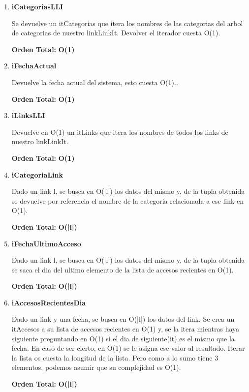 \begin{enumerate}
\item\textbf{iCategoriasLLI}
\par Se devuelve un itCategorias que itera los nombres de las categorias del arbol de categorias de nuestro linkLinkIt. Devolver el iterador cuesta O(1).
\par\textbf{Orden Total:} \textbf{O(1)}

\item\textbf{iFechaActual}
\par Devuelve la fecha actual del sistema, esto cuesta O(1)..
\par\textbf{Orden Total:} \textbf{O(1)}

\item\textbf{iLinksLLI}
\par Devuelve en O(1) un itLinks que itera los nombres de todos los links de nuestro linkLinkIt.
\par\textbf{Orden Total:} \textbf{O(1)}

\item\textbf{iCategoriaLink}
\par Dado un link l, se busca en O(|l|) los datos del mismo y, de la tupla obtenida se devuelve por referencia el nombre de la categoria relacionada a ese link en O(1).
\par\textbf{Orden Total:} \textbf{O(|l|)}

\item\textbf{iFechaUltimoAcceso}
\par Dado un link l, se busca en O(|l|) los datos del mismo y, de la tupla obtenida se saca el dia del ultimo elemento de la lista de accesos recientes en O(1).
\par\textbf{Orden Total:} \textbf{O(|l|)}

\item\textbf{iAccesosRecientesDia}
\par Dado un link y una fecha, se busca en O(|l|) los datos del link. Se crea un itAccesos a su lista de accesos recientes en O(1) y, se la itera mientras haya siguiente preguntando en O(1) si el dia de siguiente(it) es el mismo que la fecha. En caso de ser cierto, en O(1) se le asigna ese valor al resultado. Iterar la lista os cuesta la longitud de la lista. Pero como a lo sumo tiene 3 elementos, podemos asumir que su complejidad es O(1).
\par\textbf{Orden Total:} \textbf{O(|l|)}


\end{enumerate}
